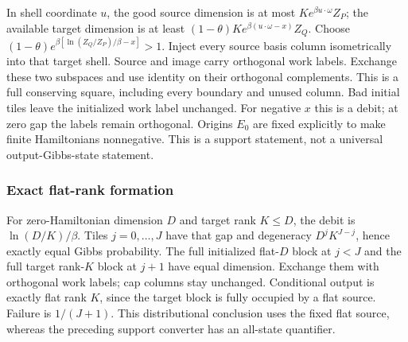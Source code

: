 In shell coordinate \(u\), the good source dimension is at most
\(K e^{\beta u\cdot\omega}Z_P\); the available target dimension is at least
\((1-\theta)K e^{\beta(u\cdot\omega-x)}Z_Q\).
Choose \((1-\theta)e^{\beta[\ln(Z_Q/Z_P)/\beta-x]}>1\).
Inject every source basis column isometrically into that target shell.
Source and image carry orthogonal work labels. Exchange these two
subspaces and use identity on their orthogonal complements. This is
a full conserving square, including every boundary and unused column.
Bad initial tiles leave the initialized work label unchanged.
For negative \(x\) this is a debit; at zero gap the labels remain
orthogonal. Origins \(E_0\) are fixed explicitly to make finite
Hamiltonians nonnegative. This is a support statement, not a universal
output-Gibbs-state statement.

\subsubsection{Exact flat-rank formation}
For zero-Hamiltonian dimension \(D\) and target rank \(K\le D\), the debit is
\(\ln(D/K)/\beta\). Tiles \(j=0,\ldots,J\) have that gap and degeneracy
\(D^jK^{J-j}\), hence exactly equal Gibbs probability.
The full initialized flat-\(D\) block at \(j<J\) and the full target
rank-\(K\) block at \(j+1\) have equal dimension. Exchange them with
orthogonal work labels; cap columns stay unchanged. Conditional output
is exactly flat rank \(K\), since the target block is fully occupied
by a flat source. Failure is \(1/(J+1)\).
This distributional conclusion uses the fixed flat source, whereas
the preceding support converter has an all-state quantifier.

